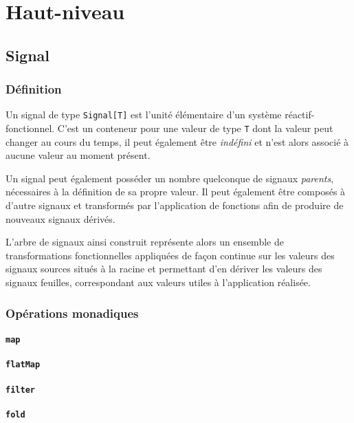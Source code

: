 \chapter{Haut-niveau}

\section{Signal}

\subsection{Définition}

Un signal de type \texttt{Signal[T]} est l'unité élémentaire d'un système réactif-fonctionnel. C'est un conteneur pour une valeur de type \texttt{T} dont la valeur peut changer au cours du temps, il peut également être \emph{indéfini} et n'est alors associé à aucune valeur au moment présent.

Un signal peut également posséder un nombre quelconque de signaux \emph{parents}, nécessaires à la définition de sa propre valeur. Il peut également être composés à d'autre signaux et transformés par l'application de fonctions afin de produire de nouveaux signaux dérivés.

L'arbre de signaux ainsi construit représente alors un ensemble de transformations fonctionnelles appliquées de façon continue sur les valeurs des signaux sources situés à la racine et permettant d'en dériver les valeurs des signaux feuilles, correspondant aux valeurs utiles à l'application réalisée.

\subsection{Opérations monadiques}

\subsubsection{\texttt{map}}
\subsubsection{\texttt{flatMap}}
\subsubsection{\texttt{filter}}
\subsubsection{\texttt{fold}}

